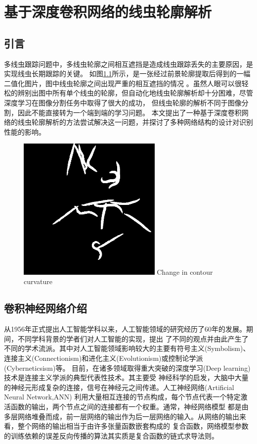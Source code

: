 \chapter{基于深度卷积网络的线虫轮廓解析}
\section{引言}
	多线虫跟踪问题中，多线虫轮廓之间相互遮挡是造成线虫跟踪丢失的主要原因，是实现线虫长期跟踪的关键。
	如图\ref{fig:multiworm}所示，是一张经过前景轮廓提取后得到的一幅二值化图片，图中线虫轮廓之间出现严重的相互遮挡的情况
	。虽然人眼可以很轻松的辨别出图中所有单个线虫的轮廓，但自动化地线虫轮廓解析却十分困难，尽管深度学习在图像分割任务中取得了很大的成功，
	但线虫轮廓的解析不同于图像分割，因此不能直接转为一个端到端的学习问题。
	本文提出了一种基于深度卷积网络的线虫轮廓解析的方法尝试解决这一问题，并探讨了多种网络结构的设计对识别性能的影响。
	\begin{figure}[h]
	  \centering
	  \includegraphics[width=7cm]{figure/chap4/multi-worm.jpg}
		{Change in contour curvature}
	  \label{fig:multiworm}
	\end{figure}
\section{卷积神经网络介绍}
	从1956年正式提出人工智能学科以来，人工智能领域的研究经历了60年的发展。期间，不同学科背景的学者们对人工智能的实现，提出
	了不同的观点并由此产生了不同的学术流派。其中对人工智能领域影响较大的主要有符号主义(Symbolism)、
	连接主义(Connectionism)和进化主义(Evolutionism)或控制论学派(Cyberneticsism)等。
	目前，在诸多领域取得重大突破的深度学习(Deep learning)技术是连接主义学派的典型代表性技术。其主要受
	神经科学的启发，大脑中大量的神经元形成复杂的连接，信号在神经元之间传递。人工神经网络(Artificial Neural Network,ANN)
	利用大量相互连接的节点构成，每个节点代表一个特定激活函数的输出，两个节点之间的连接都有一个权重。通常，神经网络模型
	都是由多层网络堆叠而成，前一层网络的输出作为后一层网络的输入。从网络的输出来看，整个网络的输出相当于由许多张量函数嵌套构成的
	复合函数，网络模型参数的训练依赖的误差反向传播的算法其实质是复合函数的链式求导法则。
	
